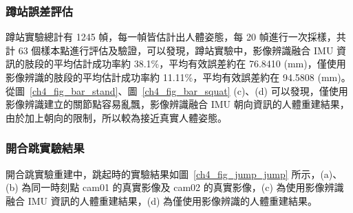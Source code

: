 \subsubsection*{蹲站誤差評估}
蹲站實驗總計有 1245 幀，每一幀皆估計出人體姿態，每 20 幀進行一次採樣，共計 63 個樣本點進行評估及驗證，可以發現，蹲站實驗中，影像辨識融合 IMU 資訊的肢段的平均估計成功率約 38.1\%，平均有效誤差約在 76.8410 (mm)，僅使用影像辨識的肢段的平均估計成功率約 11.11\%，平均有效誤差約在 94.5808 (mm)。從圖~\ref{ch4_fig_bar_stand}、圖~\ref{ch4_fig_bar_squat} (c)、(d) 可以發現，僅使用影像辨識建立的關節點容易亂飄，影像辨識融合 IMU 朝向資訊的人體重建結果，由於加上朝向的限制，所以較為接近真實人體姿態。

\clearpage

\subsubsection*{開合跳實驗結果}
開合跳實驗重建中，跳起時的實驗結果如圖~\ref{ch4_fig_jump_jump} 所示，(a)、(b) 為同一時刻點 cam01 的真實影像及 cam02 的真實影像，(c) 為使用影像辨識融合 IMU 資訊的人體重建結果，(d) 為僅使用影像辨識的人體重建結果。

